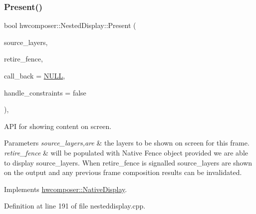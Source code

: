 \subsubsection{\texorpdfstring{Present()}{Present()}}
{\footnotesize\ttfamily bool hwcomposer\+::\+Nested\+Display\+::\+Present (\begin{DoxyParamCaption}\item[{std\+::vector$<$ \mbox{\hyperlink{structhwcomposer_1_1HwcLayer}{Hwc\+Layer}} $\ast$$>$ \&}]{source\+\_\+layers,  }\item[{int32\+\_\+t $\ast$}]{retire\+\_\+fence,  }\item[{\mbox{\hyperlink{classhwcomposer_1_1PixelUploaderCallback}{Pixel\+Uploader\+Callback}} $\ast$}]{call\+\_\+back = {\ttfamily \mbox{\hyperlink{alios_2platformdefines_8h_a070d2ce7b6bb7e5c05602aa8c308d0c4}{N\+U\+LL}}},  }\item[{bool}]{handle\+\_\+constraints = {\ttfamily false} }\end{DoxyParamCaption})\hspace{0.3cm}{\ttfamily [override]}, {\ttfamily [virtual]}}

A\+PI for showing content on screen. 
\begin{DoxyParams}{Parameters}
{\em source\+\_\+layers,are} & the layers to be shown on screen for this frame. \\
\hline
{\em retire\+\_\+fence} & will be populated with Native Fence object provided we are able to display source\+\_\+layers. When retire\+\_\+fence is signalled source\+\_\+layers are shown on the output and any previous frame composition results can be invalidated. \\
\hline
\end{DoxyParams}


Implements \mbox{\hyperlink{classhwcomposer_1_1NativeDisplay_a4825b8bc4b85e03b396ed6d2cf5bd8c0}{hwcomposer\+::\+Native\+Display}}.



Definition at line 191 of file nesteddisplay.\+cpp.


